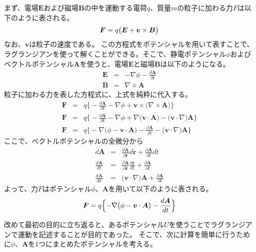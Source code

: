 \documentclass[11pt,a4paper]{jsarticle}
\begin{document}
まず、電場$\bm{E}$および磁場$\bm{B}$の中を運動する電荷$q$、質量$m$の粒子に加わる力$F$は以下のように表される。
\begin{equation}
  \bm{F} = q\bigl( \bm{E} + \bm{v} \times \bm{B} \bigr)\\
\end{equation}
なお、$\bm{v}$は粒子の速度である。
この方程式をポテンシャルを用いて表すことで、ラグランジアンを使って解くことができる。そこで、静電ポテンシャル$\phi$およびベクトルポテンシャル$\bm{A}$を使うと、電場$\bm{E}$と磁場$\bm{B}$は以下のようになる。
\begin{eqnarray}
  \bm{E} &=& - \nabla \phi - \frac{\partial \bm{A}}{\partial t} \\
  \bm{B} &=& \nabla \times \bm{A}
\end{eqnarray}
粒子に加わる力を表した方程式に、上式を純粋に代入する。
\begin{eqnarray}
  \bm{F} &=& q\bigl\{ -\frac{\partial \bm{A}}{\partial t} - \nabla \phi + \bm{v} \times \bigl( \nabla \times \bm{A} \bigr) \bigr\}\\
  \bm{F} &=& q\bigl\{ -\frac{\partial \bm{A}}{\partial t} - \nabla \phi + \nabla \bigl( \bm{v} \cdot \bm{A} \bigr) - \bigl( \bm{v} \cdot \nabla \bigr)\bm{A}\bigr\}\\
  \bm{F} &=& q\bigl\{ -\nabla \bigl( \phi - \bm{v} \cdot \bm{A} \bigr) - \frac{\partial \bm{A}}{\partial t} - \bigl( \bm{v} \cdot \nabla \bigr)\bm{A}\bigr\}
\end{eqnarray}
ここで、ベクトルポテンシャルの全微分から
\begin{eqnarray}
  d \bm{A} &=& \frac{\partial \bm{A}}{\partial \bm{r}} d \bm{r} + \frac{\partial \bm{A}}{\partial t} dt\\
  \frac{d \bm{A}}{dt} &=& \frac{\partial \bm{A}}{\partial \bm{r}} \frac{d \bm{r}}{dt} + \frac{\partial \bm{A}}{\partial t}\\
  \frac{d \bm{A}}{dt} &=& \bigl(\bm{v} \cdot \nabla \bigr)\bm{A} + \frac{\partial \bm{A}}{\partial t}
\end{eqnarray}
よって、力$F$はポテンシャル$\phi$、$\bm{A}$を用いて以下のように表される。
\begin{equation}
  \bm{F} = q\Bigl\{ -\nabla \bigl( \phi - \bm{v} \cdot \bm{A} \bigr) -\frac{d \bm{A}}{dt} \Bigr\}\\
\end{equation}

改めて最初の目的に立ち返ると、あるポテンシャル$U$を使うことでラグランジアンで運動を記述することが目的であった。
そこで、次に計算を簡単に行うために$\phi$、$\bm{A}$を1つにまとめたポテンシャルを考える。
\end{document}
